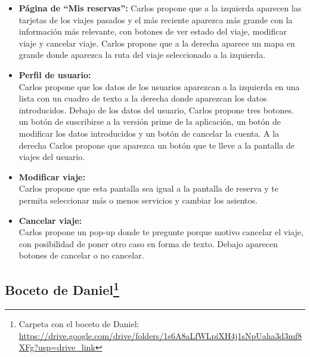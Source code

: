 \begin{itemize}
    \item\textbf{Página de ``Mis reservas'':} Carlos propone que a la izquierda aparecen las tarjetas de los viajes pasados y el más reciente aparezca más grande con la información más relevante, con botones de ver estado del viaje, modificar viaje y cancelar viaje. 
    Carlos propone que a la derecha aparece un mapa en grande donde aparezca la ruta del viaje seleccionado a la izquierda.
    
    
    \item\textbf{Perfil de usuario:} \\ Carlos propone que los datos de los usuarios aparezcan a la izquierda en una lista con un cuadro de texto a la derecha donde aparezcan los datos introducidos.
    Debajo de los datos del usuario, Carlos propone tres botones. un botón de suscribirse a la versión prime de la aplicación, un botón de modificar los datos introducidos y un botón de cancelar la cuenta.
    A la derecha Carlos propone que aparezca un botón que te lleve a la pantalla de viajes del usuario.
    

    \item\textbf{Modificar viaje:} \\ Carlos propone que esta pantalla sea igual a  la pantalla de reserva y te permita seleccionar más o menos servicios y cambiar los asientos.
    \item\textbf{Cancelar viaje:} \\ Carlos propone un pop-up donde te pregunte porque motivo cancelar el viaje, con posibilidad de poner otro caso en forma de texto.
    Debajo aparecen botones de cancelar o no cancelar.
    
    
\end{itemize}
\subsection[Boceto de Daniel]{Boceto de Daniel\footnote{Carpeta con el boceto de Daniel: \url{https://drive.google.com/drive/folders/1s6A8aLfWLpiXH4j1sNpUaha3d3mf8XFg?usp=drive_link}}}


